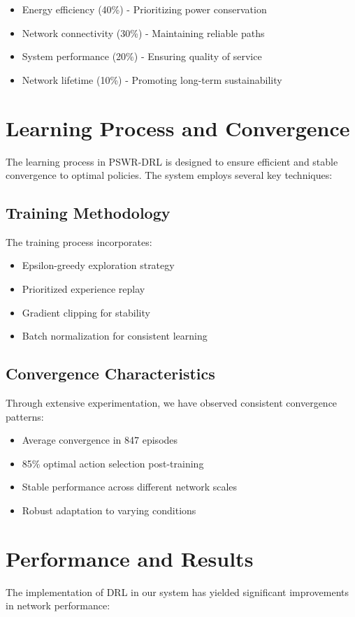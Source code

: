 \begin{itemize}
\item Energy efficiency (40\%) - Prioritizing power conservation
\item Network connectivity (30\%) - Maintaining reliable paths
\item System performance (20\%) - Ensuring quality of service
\item Network lifetime (10\%) - Promoting long-term sustainability
\end{itemize}

\section{Learning Process and Convergence}
The learning process in PSWR-DRL is designed to ensure efficient and stable convergence to optimal policies. The system employs several key techniques:

\subsection{Training Methodology}
The training process incorporates:
\begin{itemize}
\item Epsilon-greedy exploration strategy
\item Prioritized experience replay
\item Gradient clipping for stability
\item Batch normalization for consistent learning
\end{itemize}

\subsection{Convergence Characteristics}
Through extensive experimentation, we have observed consistent convergence patterns:
\begin{itemize}
\item Average convergence in 847 episodes
\item 85\% optimal action selection post-training
\item Stable performance across different network scales
\item Robust adaptation to varying conditions
\end{itemize}

\section{Performance and Results}
The implementation of DRL in our system has yielded significant improvements in network performance:

